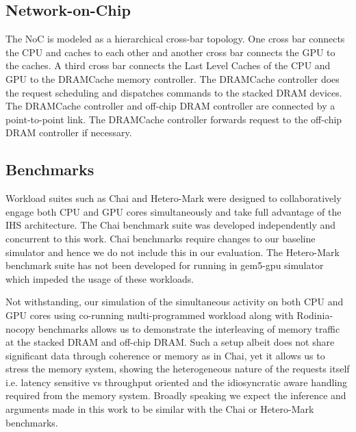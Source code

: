 \subsection{Network-on-Chip}
The NoC is modeled as a hierarchical cross-bar topology. One cross bar connects the CPU and caches to each other and another cross bar connects the GPU to the caches. A third cross bar connects the Last Level Caches of the CPU and GPU to the DRAMCache memory controller. The DRAMCache controller does the request scheduling and dispatches commands to the stacked DRAM devices. The DRAMCache controller and off-chip DRAM controller are connected by a point-to-point link. The DRAMCache controller forwards request to the off-chip DRAM controller if necessary.

\subsection{Benchmarks}
Workload suites such as Chai \cite{chai} and Hetero-Mark \cite{hetero-mark} were designed to collaboratively engage both CPU and GPU cores simultaneously and take full advantage of the IHS architecture. The Chai benchmark suite was developed independently and concurrent to this work. Chai benchmarks require changes to our baseline simulator and hence we do not include this in our evaluation.
The Hetero-Mark benchmark suite has not been developed for running in gem5-gpu simulator which impeded the usage of these workloads. 
\par Not withstanding, our simulation of the simultaneous activity on both CPU and GPU cores using co-running multi-programmed workload along with Rodinia-nocopy benchmarks allows us to demonstrate the interleaving of memory traffic at the stacked DRAM and off-chip DRAM. Such a setup albeit does not share significant data through coherence or memory as in Chai, yet it allows us to stress the memory system, showing the heterogeneous nature of the requests itself i.e. latency sensitive vs throughput oriented and the idiosyncratic aware handling required from the memory system.
Broadly speaking we expect the inference and arguments made in this work to be similar with the Chai or Hetero-Mark benchmarks.
